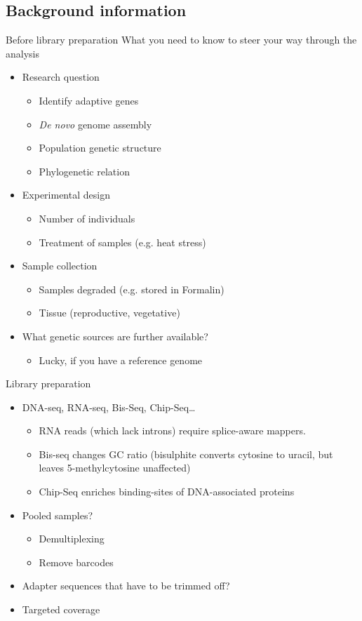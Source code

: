 \documentclass[presentation]{beamer}
\begin{document}
\subsection{Background information}
\label{sec-1-1}
\begin{frame}[label=sec-1-1-1]{Before library preparation}
What you need to know to steer your way through the analysis
\begin{itemize}
\item Research question
\begin{itemize}
\item Identify adaptive genes
\item \emph{De novo} genome assembly
\item Population genetic structure
\item Phylogenetic relation
\end{itemize}
\item Experimental design
\begin{itemize}
\item Number of individuals
\item Treatment of samples (e.g. heat stress)
\end{itemize}
\item Sample collection
\begin{itemize}
\item Samples degraded (e.g. stored in Formalin)
\item Tissue (reproductive, vegetative)
\end{itemize}
\item What genetic sources are further available? 
\begin{itemize}
\item Lucky, if you have a reference genome
\end{itemize}
\end{itemize}
\end{frame}
\begin{frame}[label=sec-1-1-2]{Library preparation}
\begin{itemize}
\item DNA-seq, RNA-seq, Bis-Seq, Chip-Seq\ldots{}
\begin{itemize}
\item RNA reads (which lack introns) require splice-aware mappers.
\item Bis-seq changes GC ratio (bisulphite converts cytosine to uracil, but leaves 5-methylcytosine unaffected)
\item Chip-Seq enriches binding-sites of DNA-associated proteins
\end{itemize}
\item Pooled samples?
\begin{itemize}
\item Demultiplexing
\item Remove barcodes
\end{itemize}
\item Adapter sequences that have to be trimmed off?
\item Targeted coverage
\end{itemize}
\end{frame}
\end{document}
